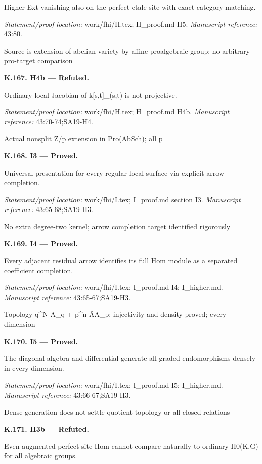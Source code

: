 Higher Ext vanishing also on the perfect etale site with exact category matching.
\par\emph{Statement/proof location:} work/fhi/H.tex; H\_proof.md H5.
\emph{Manuscript reference:} 43:80.
\par Source is extension of abelian variety by affine proalgebraic group; no arbitrary pro-target comparison
\par\medskip\noindent\textbf{K.167. H4b --- Refuted.}\par
Ordinary local Jacobian of k[s,t]\_(s,t) is not projective.
\par\emph{Statement/proof location:} work/fhi/H.tex; H\_proof.md H4b.
\emph{Manuscript reference:} 43:70-74;SA19-H4.
\par Actual nonsplit Z/p extension in Pro(AbSch); all p
\par\medskip\noindent\textbf{K.168. I3 --- Proved.}\par
Universal presentation for every regular local surface via explicit arrow completion.
\par\emph{Statement/proof location:} work/fhi/I.tex; I\_proof.md section I3.
\emph{Manuscript reference:} 43:65-68;SA19-H3.
\par No extra degree-two kernel; arrow completion target identified rigorously
\par\medskip\noindent\textbf{K.169. I4 --- Proved.}\par
Every adjacent residual arrow identifies its full Hom module as a separated coefficient completion.
\par\emph{Statement/proof location:} work/fhi/I.tex; I\_proof.md I4; I\_higher.md.
\emph{Manuscript reference:} 43:65-67;SA19-H3.
\par Topology q\textasciicircum{}N A\_q + p\textasciicircum{}n ÂA\_p; injectivity and density proved; every dimension
\par\medskip\noindent\textbf{K.170. I5 --- Proved.}\par
The diagonal algebra and differential generate all graded endomorphisms densely in every dimension.
\par\emph{Statement/proof location:} work/fhi/I.tex; I\_proof.md I5; I\_higher.md.
\emph{Manuscript reference:} 43:66-67;SA19-H3.
\par Dense generation does not settle quotient topology or all closed relations
\par\medskip\noindent\textbf{K.171. H3b --- Refuted.}\par
Even augmented perfect-site Hom cannot compare naturally to ordinary H0(K,G) for all algebraic groups.
